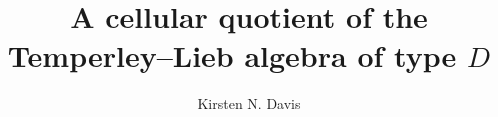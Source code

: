



\title{\MakeUppercase A cellular quotient of the Temperley--Lieb algebra of type $D$}

\author{Kirsten N. Davis}
\def\discipline{Mathematics}
\def\date{May 2014}
\def\chair{Dana C.~Ernst, Ph.D.}
\def\second{Michael Falk, Ph.D.}
\def\third{Janet McShane, Ph.D.}

 
\newtheorem{theorem}{Theorem}[section] 
\newtheorem{lemma}[theorem]{Lemma}
\newtheorem{proposition}[theorem]{Proposition}
\newtheorem{corollary}[theorem]{Corollary}
\newtheorem{conjecture}[theorem]{Conjecture}

\usepackage{enumitem}
\usepackage[section]{placeins}
\usepackage{multirow, bigdelim}
\usetikzlibrary{decorations.markings}
\theoremstyle{definition}
\newtheorem{definition}[theorem]{Definition}
\newtheorem{example}[theorem]{Example}
\newtheorem{examples}[theorem]{Examples} 
\newtheorem{problem}[theorem]{Problem} 
\newtheorem{remark}[theorem]{Remark}
\allowdisplaybreaks
\renewcommand{\H}{\mathcal{H}}
\DeclareMathOperator{\TL}{TL}
\DeclareMathOperator{\PFTL}{\widehat{TL}}

\newcommand{\Z}{\mathbb{Z}}
\newcommand{\N}{\mathbb{N}}
\newcommand{\A}{\mathcal{A}}
\newcommand{\C}{\widetilde{C}}
\renewcommand{\O}{\mathcal{O}}
\newcommand{\E}{\mathcal{E}}
\newcommand{\z}{\mathsf{z}}
\newcommand{\x}{\mathsf{x}}
\newcommand{\y}{\mathsf{y}}
\renewcommand{\u}{\mathsf{u}}
\renewcommand{\v}{\mathsf{v}}
\newcommand{\wtri}{\vartriangle}
\newcommand{\btri}{\blacktriangle}
\renewcommand{\a}{\mathbf{a}}
\renewcommand{\r}{\mathbf{p}}
\DeclareMathOperator{\DTL}{\mathbb{D}TL}
\renewcommand{\P}{\mathcal{P}}
\newcommand{\V}{\mathcal{V}}
\newcommand{\D}{\mathbb{D}}
\DeclareMathOperator{\LFD}{\mathbb{D}\widehat{TL}}
\renewcommand{\b}{\hat{b}}
\renewcommand{\d}{\hat{d}}
\newcommand{\B}{\mathbf{B}}
\newcommand{\I}{\mathcal{I}}
\newcommand{\Diag}{\mathcal{D}}
\newcommand{\wbox}{\square}
\newcommand{\bcirc}{{\color{cyan}\bullet}}
\newcommand{\bbox}{\blacksquare}
\newcommand{\supp}{\mathrm{supp}}
\renewcommand{\L}{\mathcal{L}}
\newcommand{\R}{\mathcal{R}}
\renewcommand{\(}{\left(}
\renewcommand{\)}{\right)}
\newcommand{\w}{\overline{w}}
\renewcommand{\H}{\mathcal{H}}
\renewcommand{\A}{\mathcal{A}}
\DeclareMathOperator{\FC}{FC}
\renewcommand{\r}{\mathbf{r}}
\newcommand{\WA}{W(A_{n})}
\newcommand{\WD}{W(D_{n})}
\renewcommand\thesubfigure{(\alph{subfigure})}
\renewcommand{\qed}{\hfill \mbox{$\Box$}}

